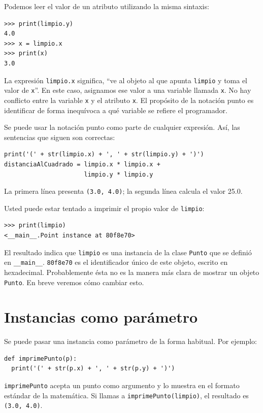 Podemos leer el valor de un atributo utilizando la misma sintaxis:

\begin{verbatim}
>>> print(limpio.y)
4.0
>>> x = limpio.x
>>> print(x)
3.0
\end{verbatim}

La expresión \texttt{limpio.x} significa, ``ve al objeto al que apunta
\texttt{limpio} y toma el valor de \texttt{x}''. En este caso, asignamos
ese valor a una variable llamada \texttt{x}. No hay conflicto entre
la variable \texttt{x} y el atributo \texttt{x}. El propósito de la
notación punto es identificar de forma inequívoca a qué variable se
refiere el programador.

Se puede usar la notación punto como parte de cualquier expresión.
Así, las sentencias que siguen son correctas:
\begin{verbatim}
print('(' + str(limpio.x) + ', ' + str(limpio.y) + ')')
distanciaAlCuadrado = limpio.x * limpio.x + 
                      limpio.y * limpio.y
\end{verbatim}

La primera línea presenta \texttt{(3.0, 4.0)}; la segunda línea calcula
el valor 25.0.

Usted puede estar tentado a imprimir el propio valor de \texttt{limpio}:
\begin{verbatim}
>>> print(limpio)
<__main__.Point instance at 80f8e70>
\end{verbatim}

El resultado indica que \texttt{limpio} es una instancia de la clase
\texttt{Punto} que se definió en \texttt{\_\_main\_\_}. \texttt{80f8e70}
es el identificador único de este objeto, escrito en hexadecimal.
Probablemente ésta no es la manera más clara de mostrar un objeto
\texttt{Punto}. En breve veremos cómo cambiar esto.


\section{Instancias como parámetro}

 

Se puede pasar una instancia como parámetro de la forma habitual.
Por ejemplo:
\begin{verbatim}
def imprimePunto(p):
  print('(' + str(p.x) + ', ' + str(p.y) + ')')
\end{verbatim}

\texttt{imprimePunto} acepta un punto como argumento y lo muestra
en el formato estándar de la matemática. Si llamas a \texttt{imprimePunto(limpio)},
el resultado es \texttt{(3.0, 4.0)}.

